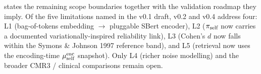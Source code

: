  states the remaining scope boundaries
together with the validation roadmap they imply. Of the five
limitations named in the v0.1 draft, v0.2 and v0.4 address four:
L1 (bag-of-tokens embedding $\to$ pluggable SBert encoder), L2
($\pi_{\text{self}}$ now carries a documented variationally-inspired
reliability link), L3 (Cohen's $d$ now falls within the
Symons \& Johnson 1997 reference band), and L5 (retrieval now uses
the encoding-time $\mu_{\text{self}}^{\text{enc}}$ snapshot). Only L4
(richer noise modelling) and the broader CMR3 / clinical
comparisons remain open.
